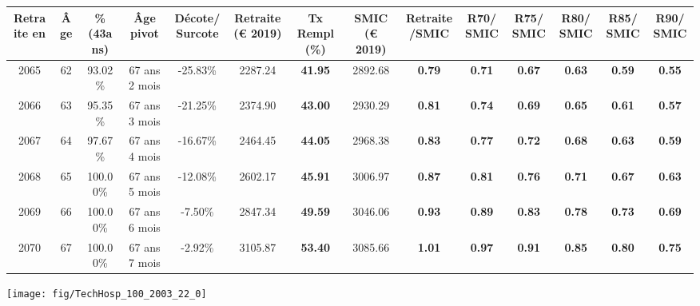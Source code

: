 \begin{adjustbox}{max width=\textwidth} 
\begin{tabular}[htb]{|c|c||c|c|c||c|c||c|c||c|c|c|c|c|} 
\hline 
 Retraite en &  Âge &  \%(43ans) &  Âge pivot &  Décote/Surcote &  Retraite (\euro{} 2019) &  Tx Rempl(\%) &  SMIC (\euro{} 2019) &  Retraite/SMIC &  R70/SMIC &  R75/SMIC &  R80/SMIC &  R85/SMIC &  R90/SMIC \\ 
\hline \hline 
 2065 &  62 &  93.02\% &  67 ans 2 mois &  -25.83\% &  2287.24 &  {\bf 41.95} &  2892.68 &  {\bf {\color{red} 0.79}} &  {\bf {\color{red} 0.71}} &  {\bf {\color{red} 0.67}} &  {\bf {\color{red} 0.63}} &  {\bf {\color{red} 0.59}} &  {\bf {\color{red} 0.55}} \\ 
\hline 
 2066 &  63 &  95.35\% &  67 ans 3 mois &  -21.25\% &  2374.90 &  {\bf 43.00} &  2930.29 &  {\bf {\color{red} 0.81}} &  {\bf {\color{red} 0.74}} &  {\bf {\color{red} 0.69}} &  {\bf {\color{red} 0.65}} &  {\bf {\color{red} 0.61}} &  {\bf {\color{red} 0.57}} \\ 
\hline 
 2067 &  64 &  97.67\% &  67 ans 4 mois &  -16.67\% &  2464.45 &  {\bf 44.05} &  2968.38 &  {\bf {\color{red} 0.83}} &  {\bf {\color{red} 0.77}} &  {\bf {\color{red} 0.72}} &  {\bf {\color{red} 0.68}} &  {\bf {\color{red} 0.63}} &  {\bf {\color{red} 0.59}} \\ 
\hline 
 2068 &  65 &  100.00\% &  67 ans 5 mois &  -12.08\% &  2602.17 &  {\bf 45.91} &  3006.97 &  {\bf {\color{red} 0.87}} &  {\bf {\color{red} 0.81}} &  {\bf {\color{red} 0.76}} &  {\bf {\color{red} 0.71}} &  {\bf {\color{red} 0.67}} &  {\bf {\color{red} 0.63}} \\ 
\hline 
 2069 &  66 &  100.00\% &  67 ans 6 mois &  -7.50\% &  2847.34 &  {\bf 49.59} &  3046.06 &  {\bf {\color{red} 0.93}} &  {\bf {\color{red} 0.89}} &  {\bf {\color{red} 0.83}} &  {\bf {\color{red} 0.78}} &  {\bf {\color{red} 0.73}} &  {\bf {\color{red} 0.69}} \\ 
\hline 
 2070 &  67 &  100.00\% &  67 ans 7 mois &  -2.92\% &  3105.87 &  {\bf 53.40} &  3085.66 &  {\bf 1.01} &  {\bf {\color{red} 0.97}} &  {\bf {\color{red} 0.91}} &  {\bf {\color{red} 0.85}} &  {\bf {\color{red} 0.80}} &  {\bf {\color{red} 0.75}} \\ 
\hline 
\hline 
\end{tabular} 
\end{adjustbox} 
 
 \vspace{0.1cm} 

 {\hspace{-2.2cm}\texttt{[image: fig/TechHosp\_100\_2003\_22\_0]}} 

